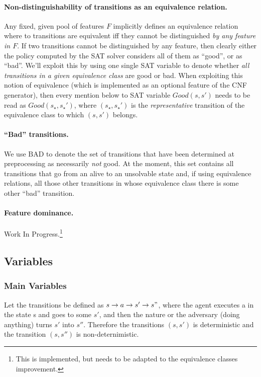 \documentclass[a4paper]{article}
\newcommand{\badtx}{\ensuremath{\mathrm{BAD}}}
\begin{document}
\paragraph{Non-distinguishability of transitions as an equivalence relation.}
Any fixed, given pool of features $F$ implicitly defines an equivalence relation where to transitions are
equivalent iff they cannot be distinguished \emph{by any feature in $F$}.
If two transitions cannot be distinguished by any feature, then clearly either the policy computed by the SAT solver
considers all of them as ``good'', or as ``bad''.
We'll exploit this by using one single SAT variable to denote whether \emph{all transitions in a given equivalence
class} are good or bad. When exploiting this notion of equivalence (which is implemented as an optional feature of
the CNF generator), then every mention below to SAT variable $Good(s, s')$ needs to be read as $Good(s_{\star}, s_{\star}')$,
where $(s_{\star}, s_{\star}')$ is the \emph{representative} transition of the equivalence class to which $(s, s')$ belongs.

\paragraph{``Bad'' transitions.}
We use \badtx{} to denote the set of transitions that have been determined at preprocessing as necessarily
\emph{not} good.
At the moment, this set contains all transitions that go from an alive to an unsolvable state and, if using
equivalence relations, all those other transitions in whose equivalence class there is some other ``bad'' transition.


\paragraph{Feature dominance.}
Work In Progress.\footnote{This is implemented, but needs to be adapted to the equivalence classes improvement.}

\newpage

\subsection{Variables}

\subsubsection{Main Variables}

Let the transitions be defined as $s \rightarrow a \rightarrow s' \rightarrow s"$, where the agent executes a in the state s and goes to some $s'$, and then the nature or the adversary (doing anything) turns $s'$ into $s''$. Therefore the transitions $(s, s')$ is deterministic and the transition $(s, s'')$ is non-deternimistic.
\end{document}
